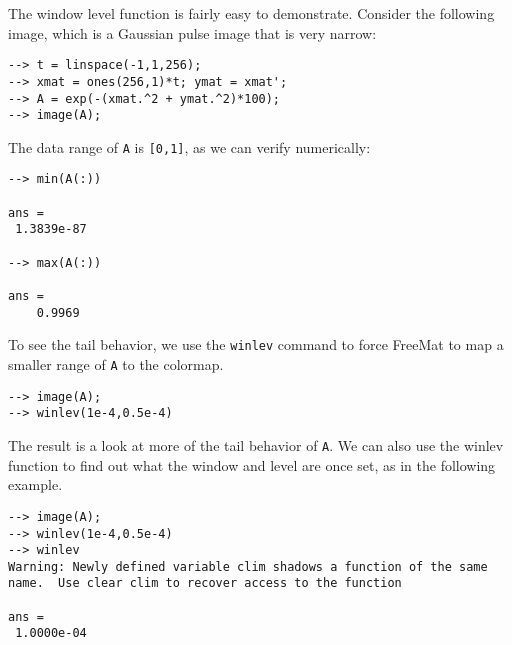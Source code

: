 The window level function is fairly easy to demonstrate.  Consider
the following image, which is a Gaussian pulse image that is very 
narrow:
\begin{verbatim}
--> t = linspace(-1,1,256);
--> xmat = ones(256,1)*t; ymat = xmat';
--> A = exp(-(xmat.^2 + ymat.^2)*100);
--> image(A);
\end{verbatim}
The data range of \verb|A| is \verb|[0,1]|, as we can verify numerically:
\begin{verbatim}
--> min(A(:))

ans = 
 1.3839e-87 

--> max(A(:))

ans = 
    0.9969 
\end{verbatim}
To see the tail behavior, we use the \verb|winlev| command to force FreeMat
to map a smaller range of \verb|A| to the colormap.
\begin{verbatim}
--> image(A);
--> winlev(1e-4,0.5e-4)
\end{verbatim}
The result is a look at more of the tail behavior of \verb|A|.
We can also use the winlev function to find out what the
window and level are once set, as in the following example.
\begin{verbatim}
--> image(A);
--> winlev(1e-4,0.5e-4)
--> winlev
Warning: Newly defined variable clim shadows a function of the same name.  Use clear clim to recover access to the function

ans = 
 1.0000e-04 
\end{verbatim}

